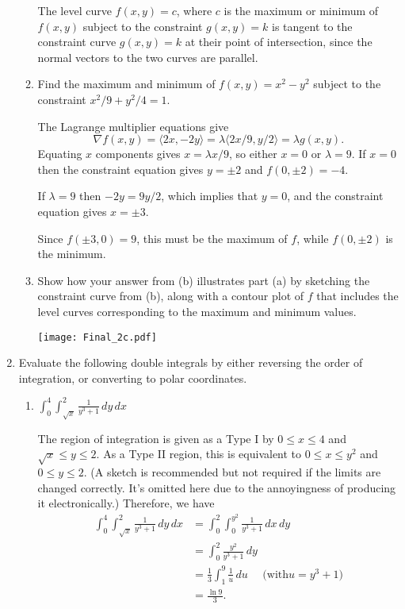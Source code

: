 \documentclass[12pt]{article}
\newcommand{\points}[1]{\marginpar{\hspace{24pt}[#1]}}
\newcommand{\di}{\displaystyle}
\begin{document}
\begin{enumerate}
\begin{enumerate}
\bigskip

The level curve $f(x,y)=c$, where $c$ is the maximum or minimum of $f(x,y)$ subject to the constraint $g(x,y)=k$ is tangent to the constraint curve $g(x,y)=k$ at their point of intersection, since the normal vectors to the two curves are parallel.

\bigskip

\item Find the maximum and minimum of $f(x,y)=x^2-y^2$ subject to the constraint $x^2/9+y^2/4=1$. \points{7}

\bigskip

The Lagrange multiplier equations give
\[
\nabla f(x,y) = \langle 2x, -2y\rangle = \lambda\langle 2x/9, y/2\rangle = \lambda g(x,y).
\]
Equating $x$ components gives $x=\lambda x/9$, so either $x=0$ or $\lambda =9$. If $x=0$ then the constraint equation gives $y = \pm 2$ and $f(0,\pm 2) = -4$.

If $\lambda = 9$ then $-2y = 9y/2$, which implies that $y=0$, and the constraint equation gives $x=\pm 3$. 

Since $f(\pm 3,0)=9$, this must be the maximum of $f$, while $f(0,\pm 2)$ is the minimum.

\bigskip


\item Show how your answer from (b) illustrates part (a) by sketching the constraint curve from (b), along with a contour plot of $f$ that includes the level curves corresponding to the maximum and minimum values. \points{4}

\bigskip

\begin{center}
\texttt{[image: Final\_2c.pdf]}
\end{center}

\bigskip

\end{enumerate}
\newpage

\item Evaluate the following double integrals by either reversing the order of integration, or converting to polar coordinates.
\begin{enumerate}
\item $\di \int_0^4\int_{\sqrt{x}}^2\frac{1}{y^3+1}\,dy\,dx$ \points{6}

\bigskip

The region of integration is given as a Type I by $0\leq x\leq 4$ and $\sqrt{x}\leq y\leq 2$. As a Type II region, this is equivalent to $0\leq x\leq y^2$ and $0\leq y\leq 2$. (A sketch is recommended but not required if the limits are changed correctly. It's omitted here due to the annoyingness of producing it electronically.) Therefore, we have
\begin{align*}
\int_0^4\int_{\sqrt{x}}^2\frac{1}{y^3+1}\,dy\,dx & = \int_0^2\int_0^{y^2}\frac{1}{y^3+1}\,dx\,dy\\
& = \int_0^2\frac{y^2}{y^3+1}\,dy\\
& = \frac{1}{3}\int_1^9 \frac{1}{u}\,du \quad\text{ (with}u=y^3+1)\\
& = \frac{\ln 9}{3}.
\end{align*}


\end{enumerate}
\end{enumerate}
\end{document}
